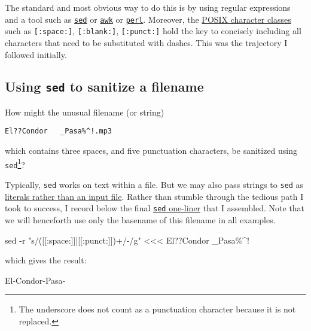 \documentclass[
  a4paper,
]{article}
\newenvironment{Shaded}{\begin{snugshade}}{\end{snugshade}}
\newcommand{\AttributeTok}[1]{\textcolor[rgb]{0.80,0.80,0.80}{#1}}
\newcommand{\FunctionTok}[1]{\textcolor[rgb]{0.94,0.94,0.56}{#1}}
\newcommand{\NormalTok}[1]{\textcolor[rgb]{0.80,0.80,0.80}{#1}}
\newcommand{\OperatorTok}[1]{\textcolor[rgb]{0.94,0.94,0.82}{#1}}
\newcommand{\StringTok}[1]{\textcolor[rgb]{0.80,0.58,0.58}{#1}}
\begin{document}
The standard and most obvious way to do this is by using regular
expressions and a tool such as
\href{https://www.grymoire.com/Unix/Sed.html}{\texttt{sed}} or
\href{https://tldp.org/LDP/abs/html/awk.html}{\texttt{awk}} or
\href{https://perldoc.perl.org/perlretut}{\texttt{perl}}. Moreover, the
\href{https://www.regular-expressions.info/posixbrackets.html}{POSIX
character classes} such as \texttt{{[}:space:{]}},
\texttt{{[}:blank:{]}}, \texttt{{[}:punct:{]}} hold the key to concisely
including all characters that need to be substituted with dashes. This
was the trajectory I followed initially.

\hypertarget{using-sed-to-sanitize-a-filename}{%
\subsection{\texorpdfstring{Using \texttt{sed} to sanitize a
filename}{Using sed to sanitize a filename}}\label{using-sed-to-sanitize-a-filename}}

How might the unusual filename (or string)

\texttt{El??Condor\ \ \ \_Pasa\%\^{}!.mp3}

which contains three spaces, and five punctuation characters, be
sanitized using \texttt{sed}\footnote{The underscore does not count as a
  punctuation character because it is not replaced.}?

Typically, \texttt{sed} works on text within a file. But we may also
pass strings to \texttt{sed} as
\href{https://www.baeldung.com/linux/sed-with-string}{literals rather
than an input file}. Rather than stumble through the tedious path I took
to success, I record below the final
\href{https://catonmat.net/sed-one-liners-explained-part-one}{\texttt{sed}
one-liner} that I assembled. Note that we will henceforth use only the
basename of this filename in all examples.

\begin{Shaded}
\begin{Highlighting}[]
\FunctionTok{sed} \AttributeTok{{-}r} \StringTok{"s/([[:space:]]|[[:punct:]])+/{-}/g"} \OperatorTok{\textless{}\textless{}\textless{}} \StringTok{\textquotesingle{}El??Condor   \_Pasa\%\^{}!\textquotesingle{}}
\end{Highlighting}
\end{Shaded}

which gives the result:

\begin{Shaded}
\begin{Highlighting}[]
\NormalTok{El{-}Condor{-}Pasa{-}}
\end{Highlighting}
\end{Shaded}
\end{document}
